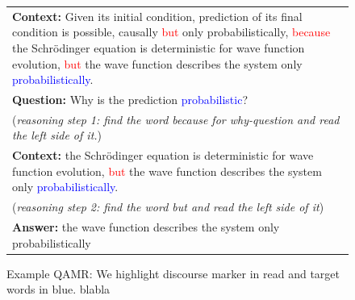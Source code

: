 \begin{figure}[t]
	{\fontsize{9}{10}\selectfont
    \setlength{\tabcolsep}{0.6mm}
    \begin{tabular}{|p{75mm}|}
    \hline
\textbf{Context: }Given its initial condition, prediction of its final condition is possible, causally \textcolor{red}{but} only probabilistically, \textcolor{red}{because} the Schrödinger equation is deterministic for wave function evolution, \textcolor{red}{but} the wave function describes the system only \textcolor{blue}{probabilistically}.\\
\textbf{Question: }Why is the prediction
\textcolor{blue}{probabilistic}? \\
(\textit{reasoning step 1: find the word because for why-question and read the left side of it.})\\
\textbf{Context: }the Schrödinger equation is deterministic for wave function evolution, \textcolor{red}{but} the wave function describes the system only \textcolor{blue}{probabilistically}.\\
(\textit{reasoning step 2: find the word but and read the left side of it})\\
\textbf{Answer: }the wave function describes the system only probabilistically\\
\hline
    \end{tabular}
    }
\caption{Example QAMR: We highlight discourse marker in read and target words in blue. blabla }
\label{fig:qa_example_reason}
\end{figure}



